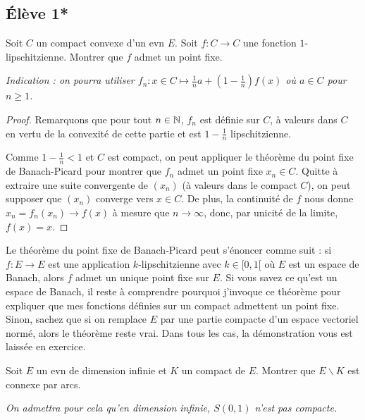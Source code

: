 \documentclass[10pt]{scrartcl}
\title{}
\author{}
\date{}
\begin{document}
    \subsection*{Élève 1*}
    \begin{exo}
        Soit $C$ un compact convexe d'un evn $E$. 
        Soit $f:C\to C$ une fonction $1$-lipschitzienne. 
        Montrer que $f$ admet un point fixe. 

        \textit{Indication : on pourra utiliser $f_n:x\in C\mapsto \frac1na+\left(1-\frac1n\right)f(x)$ où $a\in C$ pour $n\geq 1$.}
    \end{exo}

    \begin{proof}
        Remarquons que pour tout $n\in\operatorname{\mathbb N}$, $f_n$ est définie sur $C$, à valeurs dans $C$ en vertu de la convexité de cette partie et est $1-\frac1n$ lipschitzienne. 
        
        Comme $1-\frac1n<1$ et $C$ est compact, on peut appliquer le théorème du point fixe de Banach-Picard pour montrer que $f_n$ admet un point fixe $x_n\in C$. 
        Quitte à extraire une suite convergente de $(x_n)$ (à valeurs dans le compact $C$), on peut supposer que $(x_n)$ converge vers $x\in C$. 
        De plus, la continuité de $f$ nous donne $x_n=f_n(x_n)\to f(x)$ à mesure que $n\to\infty$, donc, par unicité de la limite, $f(x)=x$.
    \end{proof}

    \begin{remarks}
        Le théorème du point fixe de Banach-Picard peut s'énoncer comme suit : si $f:E\to E$ est une application $k$-lipschitzienne avec $k\in[0,1[$ où $E$ est un espace de Banach, alors $f$ admet un unique point fixe sur $E$.
        Si vous savez ce qu'est un espace de Banach, il reste à comprendre pourquoi j'invoque ce théorème pour expliquer que mes fonctions définies sur un compact admettent un point fixe.
        Sinon, sachez que si on remplace $E$ par une partie compacte d'un espace vectoriel normé, alors le théorème reste vrai. Dans tous les cas, la démonstration vous est laissée en exercice.
    \end{remarks}
    
    \begin{exo}
        Soit $E$ un evn de dimension infinie et $K$ un compact de $E$. 
        Montrer que $E\backslash K$ est connexe par arcs.

        \textit{On admettra pour cela qu'en dimension infinie, $S(0,1)$ n'est pas compacte.}
    \end{exo}
\end{document}
